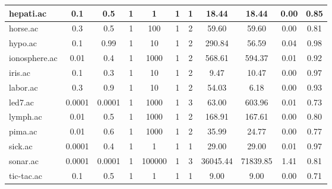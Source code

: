 \begin{table}[htbp]
\begin{tabular}{|l|c|c|c|c|c|c||c|c|c|c|}
		\hline
		hepati.ac      & 0.1      & 0.5         & 1              & 1                   & 1             & 1             & 18.44          & 18.44          & 0.00           & 0.85           \\
		\hline
		horse.ac       & 0.3      & 0.5         & 1              & 100                 & 1             & 2             & 59.60          & 59.60          & 0.00           & 0.81           \\
		\hline
		hypo.ac        & 0.1      & 0.99        & 1              & 10                  & 1             & 2             & 290.84         & 56.59          & 0.04           & 0.98           \\
		\hline
		ionosphere.ac  & 0.01     & 0.4         & 1              & 1000                & 1             & 2             & 568.61         & 594.37         & 0.01           & 0.92           \\
		\hline
		iris.ac        & 0.1      & 0.3         & 1              & 10                  & 1             & 2             & 9.47           & 10.47          & 0.00           & 0.97           \\
		\hline
		labor.ac       & 0.3      & 0.9         & 1              & 10                  & 1             & 2             & 54.03          & 6.18           & 0.00           & 0.93           \\
		\hline
		led7.ac        & 0.0001   & 0.0001      & 1              & 1000                & 1             & 3             & 63.00          & 603.96         & 0.01           & 0.73           \\
		\hline
		lymph.ac       & 0.01     & 0.5         & 1              & 1000                & 1             & 2             & 168.91         & 167.61         & 0.00           & 0.80           \\
		\hline
		pima.ac        & 0.01     & 0.6         & 1              & 1000                & 1             & 2             & 35.99          & 24.77          & 0.00           & 0.77           \\
		\hline
		sick.ac        & 0.0001   & 0.4         & 1              & 1                   & 1             & 1             & 29.00          & 29.00          & 0.01           & 0.97           \\
		\hline
		sonar.ac       & 0.0001   & 0.0001      & 1              & 100000              & 1             & 3             & 36045.44       & 71839.85       & 1.41           & 0.81           \\
		\hline
		tic-tac.ac     & 0.1      & 0.5         & 1              & 1                   & 1             & 1             & 9.00           & 9.00           & 0.00           & 0.71           \\

\end{tabular}
\end{table}
